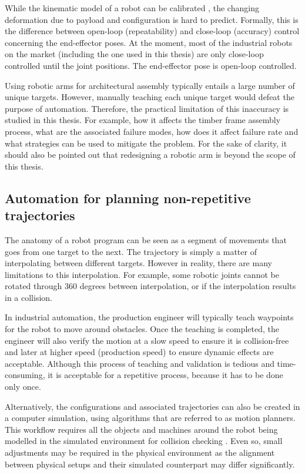 While the kinematic model of a robot can be calibrated \parencite{mooringFundamentalsManipulatorCalibration1991}, the changing deformation due to payload and configuration is hard to predict. Formally, this is the difference between open-loop (repeatability) and close-loop (accuracy) control concerning the end-effector poses. At the moment, most of the industrial robots on the market (including the one used in this thesis) are only close-loop controlled until the joint positions. The end-effector pose is open-loop controlled.  

Using robotic arms for architectural assembly typically entails a large number of unique targets. However, manually teaching each unique target would defeat the purpose of automation. Therefore, the practical limitation of this inaccuracy is studied in this thesis. For example, how it affects the timber frame assembly process, what are the associated failure modes, how does it affect failure rate and what strategies can be used to mitigate the problem. For the sake of clarity, it should also be pointed out that redesigning a robotic arm is beyond the scope of this thesis.

\subsection{Automation for planning non-repetitive trajectories}
\label{subsection:introduction_automation_for_planning_non_repetitive_trajectories}

The anatomy of a robot program can be seen as a segment of movements that goes from one target to the next. The trajectory is simply a matter of interpolating between different targets. However in reality, there are many limitations to this interpolation. For example, some robotic joints cannot be rotated through 360 degrees between interpolation, or if the interpolation results in a collision.

In industrial automation, the production engineer will typically teach waypoints for the robot to move around obstacles. Once the teaching is completed, the engineer will also verify the motion at a slow speed to ensure it is collision-free and later at higher speed (production speed) to ensure dynamic effects are acceptable. Although this process of teaching and validation is tedious and time-consuming, it is acceptable for a repetitive process, because it has to be done only once. 

Alternatively, the configurations and associated trajectories can also be created in a computer simulation, using algorithms that are referred to as motion planners\parencite{lavallePlanningAlgorithms2006}. This workflow requires all the objects and machines around the robot being modelled in the simulated environment for collision checking . Even so, small adjustments may be required in the physical environment as the alignment between physical setups and their simulated counterpart may differ significantly.

